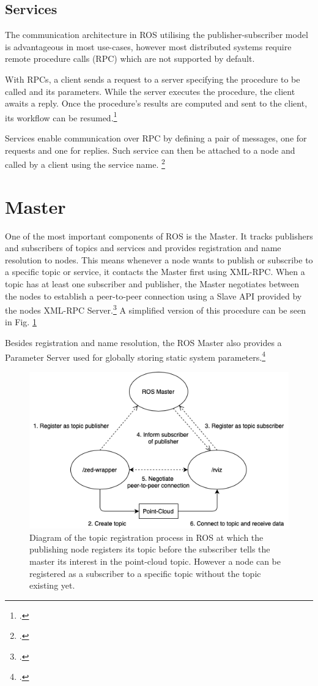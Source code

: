 \subsection{Services}
The communication architecture in ROS utilising the publisher-subscriber model is advantageous in most use-cases, however most distributed systems require remote procedure calls (RPC) which are not supported by default.

With RPCs, a client sends a request to a server specifying the procedure to be called and its parameters. While the server executes the procedure, the client awaits a reply. Once the procedure's results are computed and sent to the client, its workflow can be resumed.\footcite[Page 3]{rfc1831}

Services enable communication over RPC by defining a pair of messages, one for requests and one for replies. Such service can then be attached to a node and called by a client using the service name. \footcite{openSourceRoboticsFoundationServicesNodate}




\section{Master}
One of the most important components of ROS is the Master. It tracks publishers and subscribers of topics and services and provides registration and name resolution to nodes. This means whenever a node wants to publish or subscribe to a specific topic or service, it contacts the Master first using XML-RPC. When a topic has at least one subscriber and publisher, the Master negotiates between the nodes to establish a peer-to-peer connection using a Slave API provided by the nodes XML-RPC Server.\footcite{openSourceRoboticsFoundationMasterNodate} A simplified version of this procedure can be seen in Fig. \ref{fig:ros_master_reg}

Besides registration and name resolution, the ROS Master also provides a Parameter Server used for globally storing static system parameters.\footcite{openSourceRoboticsFoundationParameterServerNodate}
\begin{figure}[]
	\centering
	\includegraphics[width=0.8\linewidth]{img/ros_master_registration}
	\caption{Diagram of the topic registration process in ROS at which the publishing node registers its topic before the subscriber tells the master its interest in the point-cloud topic. However a node can be registered as a subscriber to a specific topic without the topic existing yet.}
	\label{fig:ros_master_reg}
\end{figure}



